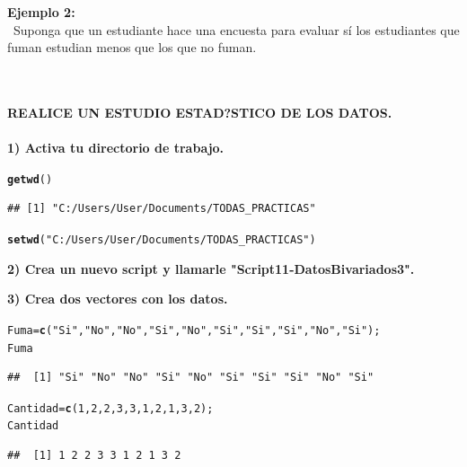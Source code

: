 \documentclass[12pt,letterpaper]{article}\usepackage[]{graphicx}\usepackage[]{color}
\makeatletter
\newcommand{\hlnum}[1]{\textcolor[rgb]{0.686,0.059,0.569}{#1}}%
\newcommand{\hlstr}[1]{\textcolor[rgb]{0.192,0.494,0.8}{#1}}%
\newcommand{\hlstd}[1]{\textcolor[rgb]{0.345,0.345,0.345}{#1}}%
\newcommand{\hlkwb}[1]{\textcolor[rgb]{0.69,0.353,0.396}{#1}}%
\newcommand{\hlkwd}[1]{\textcolor[rgb]{0.737,0.353,0.396}{\textbf{#1}}}%
\newenvironment{kframe}{%
 \def\at@end@of@kframe{}%
 \ifinner\ifhmode%
  \def\at@end@of@kframe{\end{minipage}}%
  \begin{minipage}{\columnwidth}%
 \fi\fi%
 \def\FrameCommand##1{\hskip\@totalleftmargin \hskip-\fboxsep
 \colorbox{shadecolor}{##1}\hskip-\fboxsep
     \hskip-\linewidth \hskip-\@totalleftmargin \hskip\columnwidth}%
 \MakeFramed {\advance\hsize-\width
   \@totalleftmargin\z@ \linewidth\hsize
   \@setminipage}}%
 {\par\unskip\endMakeFramed%
 \at@end@of@kframe}
\newenvironment{knitrout}{}{} %
\makeatother
\begin{document}
\textbf{Ejemplo 2:}
\\\ Suponga que un estudiante hace una encuesta para evaluar s\'i los estudiantes que fuman estudian menos que los que no fuman.\\\\\

\textbf {REALICE UN ESTUDIO ESTAD?STICO DE LOS DATOS.}\\\\

\textbf {1) Activa tu directorio de trabajo.}
\begin{knitrout}
\color{fgcolor}\begin{kframe}
\begin{alltt}
\hlkwd{getwd}\hlstd{()}
\end{alltt}
\begin{verbatim}
## [1] "C:/Users/User/Documents/TODAS_PRACTICAS"
\end{verbatim}
\begin{alltt}
\hlkwd{setwd}\hlstd{(}\hlstr{"C:/Users/User/Documents/TODAS_PRACTICAS"}\hlstd{)}
\end{alltt}
\end{kframe}
\end{knitrout}
\textbf {2) Crea un nuevo script y llamarle "Script11-DatosBivariados3".}

\textbf {3) Crea dos vectores con los datos.} 
\begin{knitrout}
\color{fgcolor}\begin{kframe}
\begin{alltt}
\hlstd{Fuma} \hlkwb{=} \hlkwd{c}\hlstd{(}\hlstr{"Si"}\hlstd{,}\hlstr{"No"}\hlstd{,}\hlstr{"No"}\hlstd{,}\hlstr{"Si"}\hlstd{,}\hlstr{"No"}\hlstd{,}\hlstr{"Si"}\hlstd{,}\hlstr{"Si"}\hlstd{,}\hlstr{"Si"}\hlstd{,}\hlstr{"No"}\hlstd{,}\hlstr{"Si"}\hlstd{);}
\hlstd{Fuma}
\end{alltt}
\begin{verbatim}
##  [1] "Si" "No" "No" "Si" "No" "Si" "Si" "Si" "No" "Si"
\end{verbatim}
\begin{alltt}
\hlstd{Cantidad} \hlkwb{=} \hlkwd{c}\hlstd{(}\hlnum{1}\hlstd{,}\hlnum{2}\hlstd{,}\hlnum{2}\hlstd{,}\hlnum{3}\hlstd{,}\hlnum{3}\hlstd{,}\hlnum{1}\hlstd{,}\hlnum{2}\hlstd{,}\hlnum{1}\hlstd{,}\hlnum{3}\hlstd{,}\hlnum{2}\hlstd{);}
\hlstd{Cantidad}
\end{alltt}
\begin{verbatim}
##  [1] 1 2 2 3 3 1 2 1 3 2
\end{verbatim}
\end{kframe}
\end{knitrout}
\end{document}
